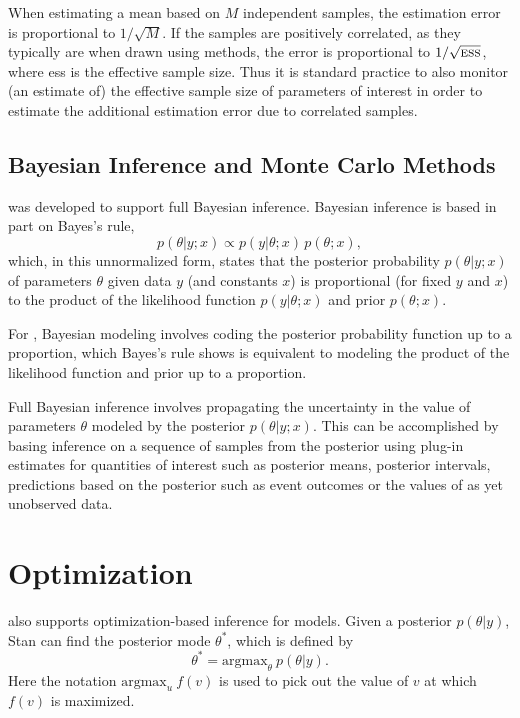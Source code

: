 When estimating a mean based on $M$ independent samples, the
estimation error is proportional to $1/\sqrt{M}$.  If the samples are
positively correlated, as they typically are when drawn using \MCMC
methods, the error is proportional to $1/\sqrt{\mbox{\sc ess}}$, where
{\sc ess} is the effective sample size.  Thus it is standard practice
to also monitor (an estimate of) the effective sample size of
parameters of interest in order to estimate the additional estimation
error due to correlated samples.

\subsection{Bayesian Inference and Monte Carlo Methods}

\Stan was developed to support full Bayesian inference.  Bayesian
inference is based in part on Bayes's rule,
\[
p(\theta|y;x) \propto p(y|\theta;x) \, p(\theta;x),
\]
which, in this unnormalized form, states that the posterior
probability $p(\theta|y;x)$ of parameters $\theta$ given data $y$ (and
constants $x$) is proportional (for fixed $y$ and $x$) to the
product of the likelihood function $p(y|\theta;x)$ and prior
$p(\theta;x)$.

For \Stan, Bayesian modeling involves coding the posterior probability
function up to a proportion, which Bayes's rule shows is equivalent to
modeling the product of the likelihood function and prior up to a
proportion.

Full Bayesian inference involves propagating the uncertainty in the
value of parameters $\theta$ modeled by the posterior $p(\theta|y;x)$.
This can be accomplished by basing inference on a sequence of samples
from the posterior using plug-in estimates for quantities of interest
such as posterior means, posterior intervals, predictions based on the
posterior such as event outcomes or the values of as yet unobserved
data.


\section{Optimization}

\Stan also supports optimization-based inference for models.  Given a
posterior $p(\theta|y)$, Stan can find the posterior mode $\theta^*$,
which is defined by
%
\[
\theta^{*} = \mbox{argmax}_{\theta} \ p(\theta|y).
\]
%
Here the notation $\mbox{argmax}_u \ f(v)$ is used to pick out the value
of $v$ at which $f(v)$ is maximized.  

